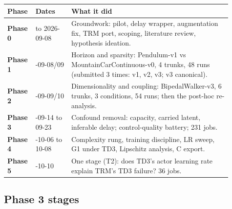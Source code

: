 \documentclass[11pt]{article}
\begin{document}
\begin{center}\small\begin{tabular}{>{\raggedright\arraybackslash}p{0.074\linewidth}>{\raggedright\arraybackslash}p{0.153\linewidth}>{\raggedright\arraybackslash}p{0.679\linewidth}}
\toprule
Phase & Dates & What it did \\
\midrule
\textbf{Phase 0} & to 2026-09-08 & Groundwork: pilot, delay wrapper, augmentation fix, TRM port, scoping, literature review, hypothesis ideation. \\
\textbf{Phase 1} & 2026-09-08/09 & Horizon and sparsity: Pendulum-v1 vs MountainCarContinuous-v0, 4 trunks, 48 runs (submitted 3 times: v1, v2, v3; v3 canonical). \\
\textbf{Phase 2} & 2026-09-09/10 & Dimensionality and coupling: BipedalWalker-v3, 6 trunks, 3 conditions, 54 runs; then the post-hoc re-analysis. \\
\textbf{Phase 3} & 2026-09-14 to 09-23 & Confound removal: capacity, carried latent, inferable delay; control-quality battery; 231 jobs. \\
\textbf{Phase 4} & 2026-10-06 to 10-08 & Complexity rung, training discipline, LR sweep, G1 under TD3, Lipschitz analysis, C export. \\
\textbf{Phase 5} & 2026-10-10 & One stage (T2): does TD3's actor learning rate explain TRM's TD3 failure? 36 jobs. \\
\bottomrule
\end{tabular}\end{center}



\subsection*{Phase 3 stages}
\end{document}
